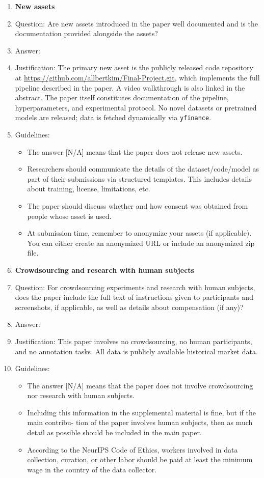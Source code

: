 \documentclass{article}
\begin{document}
\begin{enumerate}
\item {\bf New assets}
    \item[] Question: Are new assets introduced in the paper well documented and is the documentation
provided alongside the assets?
    \item[] Answer: \answerYes{}
    \item[] Justification: The primary new asset is the publicly released code repository at
    \url{https://github.com/allbertkim/Final-Project.git}, which implements the full
    pipeline described in the paper. A video walkthrough is also linked in the abstract. The
    paper itself constitutes documentation of the pipeline, hyperparameters, and experimental
    protocol. No novel datasets or pretrained models are released; data is fetched dynamically
    via \texttt{yfinance}.
    \item[] Guidelines:
    \begin{itemize}
        \item The answer [N/A] means that the paper does not release new assets.
        \item Researchers should communicate the details of the dataset/code/model as part of their
submissions via structured templates. This includes details about training, license,
limitations, etc.
        \item The paper should discuss whether and how consent was obtained from people whose
asset is used.
        \item At submission time, remember to anonymize your assets (if applicable). You can either
create an anonymized URL or include an anonymized zip file.
    \end{itemize}

\item {\bf Crowdsourcing and research with human subjects}
    \item[] Question: For crowdsourcing experiments and research with human subjects, does the paper
include the full text of instructions given to participants and screenshots, if applicable, as
well as details about compensation (if any)?
    \item[] Answer: \answerNA{}
    \item[] Justification: This paper involves no crowdsourcing, no human participants, and no
    annotation tasks. All data is publicly available historical market data.
    \item[] Guidelines:
    \begin{itemize}
        \item The answer [N/A] means that the paper does not involve crowdsourcing nor research
with human subjects.
        \item Including this information in the supplemental material is fine, but if the main contribu-
tion of the paper involves human subjects, then as much detail as possible should be
included in the main paper.
        \item According to the NeurIPS Code of Ethics, workers involved in data collection, curation,
or other labor should be paid at least the minimum wage in the country of the data
collector.
    \end{itemize}


\end{enumerate}
\end{document}
